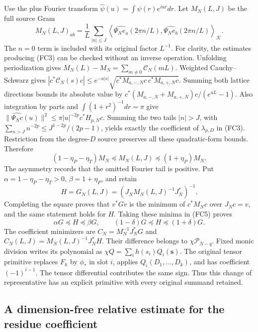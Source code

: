 Use the plus Fourier transform $\widehat\psi(u)=\int\psi(r)e^{iur}dr$.
Let $M_N(L,J)$ be the full source Gram
\[
 M_N(L,J)_{ab}=\frac1L\sum_{|n|\le J}
 \left\langle\widehat{\Psi_N e_a}(2\pi n/L),
                  \widehat{\Psi_N e_b}(2\pi n/L)\right\rangle_{\mathcal K}.
 \tag{FC4}
\]
The $n=0$ term is included with its original factor $L^{-1}$.
For clarity, the estimates producing (FC3) can be checked without an
inverse operation. Unfolding periodization gives
$M_N(L)-M_N=\sum_{m\ne0}\mathcal C_N(mL)$. Weighted Cauchy--Schwarz gives
$|c^*\mathcal C_N(s)c|\le e^{-a|s|}
\sqrt{c^*M_{a,-,N}c\,c^*M_{a,+,N}c}$.
Summing both lattice directions bounds its absolute value by
$c^*(M_{a,-,N}+M_{a,+,N})c/(e^{aL}-1)$.
Also integration by parts and $\int(1+r^2)^{-1}dr=\pi$ give
$\|\widehat{\Psi_Nc}(u)\|^2\le\pi|u|^{-2p}c^*H_{p,N}c$.
Summing the two tails $|n|>J$, with
$\sum_{n>J}n^{-2p}\le J^{1-2p}/(2p-1)$, yields exactly
the coefficient of $\lambda_{p,D}$ in (FC3). Restriction from the
degree-$D$ source preserves all these quadratic-form bounds. Therefore
\[
 (1-\eta_P-\eta_T)M_N\preceq M_N(L,J)
       \preceq(1+\eta_P)M_N.
 \tag{FC5}
\]
The asymmetry records that the omitted Fourier tail is positive.
Put $\alpha=1-\eta_P-\eta_T>0$, $\beta=1+\eta_P$, and retain
\[
 H=G_N(L,J)=(J_NM_N(L,J)^{-1}J_N^*)^{-1}.
 \tag{FC6}
\]
Completing the square proves that $v^*Gv$ is the minimum of $c^*M_Nc$
over $J_Nc=v$, and the same statement holds for $H$. Taking these
minima in (FC5) proves
\[
 \alpha G\preceq H\preceq\beta G,
 \qquad (1-\delta)G\preceq H\preceq(1+\delta)G.
 \tag{FC7}
\]
The coefficient minimizers are $C_N=M_N^{-1}J_N^*G$ and
$C_N(L,J)=M_N(L,J)^{-1}J_N^*H$. Their difference belongs to
$\chi\mathcal P_{N-q}$. Fixed monic division writes its polynomial
as $\chi Q=\sum_i h(s_i)Q_i(\mathbf s)$. The original tensor primitive
replaces $F_h$ by $\phi_*$ in slot $i$, applies $Q_i(D_1,\ldots,D_k)$,
and has coefficient $(-1)^{i-1}$. The tensor differential contributes
the same sign. Thus this change of representative has an explicit
primitive with every original summand retained.

\subsection{A dimension-free relative estimate for the residue coefficient}

